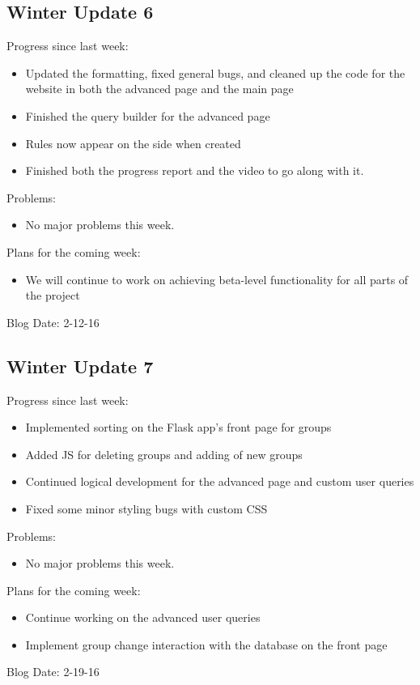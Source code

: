 \subsection{Winter Update 6}
Progress since last week:
\begin{itemize}
\item Updated the formatting, fixed general bugs, and cleaned up the code for the website in both the advanced page and the main page
\item Finished the query builder for the advanced page
\item Rules now appear on the side when created
\item Finished both the progress report and the video to go along with it.
\end{itemize}
Problems:
\begin{itemize}
\item No major problems this week.
\end{itemize}
Plans for the coming week: 
\begin{itemize}
\item We will continue to work on achieving beta-level functionality for all parts of the project
\end{itemize}
Blog Date: 2-12-16

\subsection{Winter Update 7}
Progress since last week:
\begin{itemize}
\item Implemented sorting on the Flask app's front page for groups
\item Added JS for deleting groups and adding of new groups
\item Continued logical development for the advanced page and custom user queries
\item Fixed some minor styling bugs with custom CSS
\end{itemize}
Problems:
\begin{itemize}
\item No major problems this week.
\end{itemize}
Plans for the coming week: 
\begin{itemize}
\item Continue working on the advanced user queries
\item Implement group change interaction with the database on the front page
\end{itemize}
Blog Date: 2-19-16

